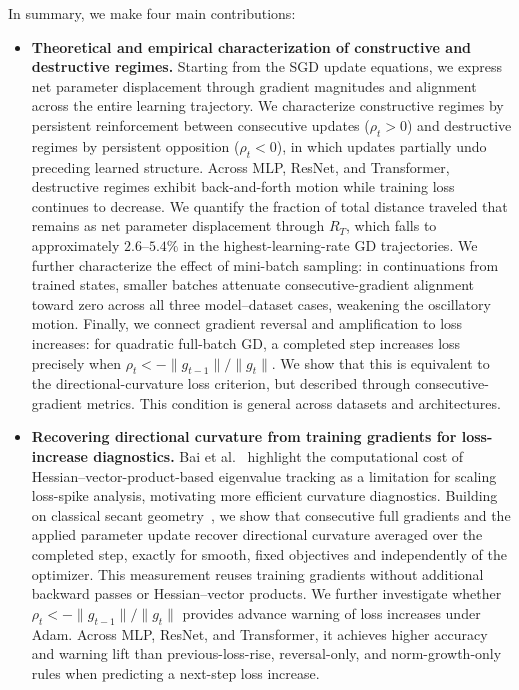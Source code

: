 In summary, we make four main contributions:
\begin{itemize}
\item \textbf{Theoretical and empirical characterization of constructive and destructive regimes.} Starting from the SGD update equations, we express net parameter displacement through gradient magnitudes and alignment across the entire learning trajectory. We characterize constructive regimes by persistent reinforcement between consecutive updates (\(\rho_t>0\)) and destructive regimes by persistent opposition (\(\rho_t<0\)), in which updates partially undo preceding learned structure. Across MLP, ResNet, and Transformer, destructive regimes exhibit back-and-forth motion while training loss continues to decrease. We quantify the fraction of total distance traveled that remains as net parameter displacement through \(R_T\), which falls to approximately \(2.6\)--\(5.4\%\) in the highest-learning-rate GD trajectories. We further characterize the effect of mini-batch sampling: in continuations from trained states, smaller batches attenuate consecutive-gradient alignment toward zero across all three model–dataset cases, weakening the oscillatory motion. Finally, we connect gradient reversal and amplification to loss increases: for quadratic full-batch GD, a completed step increases loss precisely when \(\rho_t<-\|g_{t-1}\|/\|g_t\|\). We show that this is equivalent to the directional-curvature loss criterion, but described through consecutive-gradient metrics. This condition is general across datasets and architectures.

\item \textbf{Recovering directional curvature from training gradients for loss-increase diagnostics.} Bai et al.~\cite{bai2026spikes} highlight the computational cost of Hessian--vector-product-based eigenvalue tracking as a limitation for scaling loss-spike analysis, motivating more efficient curvature diagnostics. Building on classical secant geometry~\cite{barzilai1988two,tan2016bbsgd}, we show that consecutive full gradients and the applied parameter update recover directional curvature averaged over the completed step, exactly for smooth, fixed objectives and independently of the optimizer. This measurement reuses training gradients without additional backward passes or Hessian--vector products. We further investigate whether \(\rho_t<-\|g_{t-1}\|/\|g_t\|\) provides advance warning of loss increases under Adam. Across MLP, ResNet, and Transformer, it achieves higher accuracy and warning lift than previous-loss-rise, reversal-only, and norm-growth-only rules when predicting a next-step loss increase.


\end{itemize}
